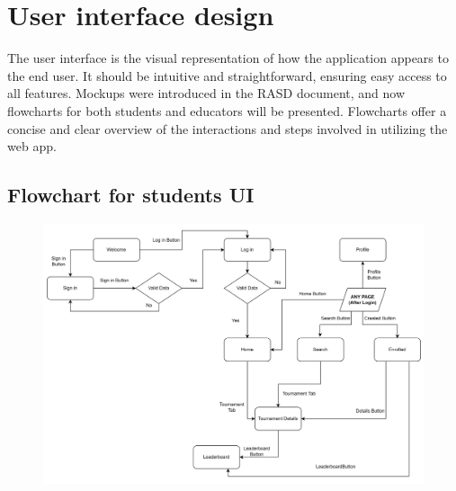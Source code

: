 \documentclass[12pt, a4paper]{report}
\begin{document}
\newpage 

\chapter{User interface design}
    The user interface is the visual representation of how the application appears to the end user.
    It should be intuitive and straightforward, ensuring easy access to all features.
    Mockups were introduced in the RASD document, and now flowcharts for both students and educators will be presented.
    Flowcharts offer a concise and clear overview of the interactions and steps involved in utilizing the web app.
    \section{Flowchart for students UI}
    \begin{figure}[H]
        \centering\includegraphics[width=0.9\linewidth]{images/students_UI.png}
    \end{figure}
\end{document}
